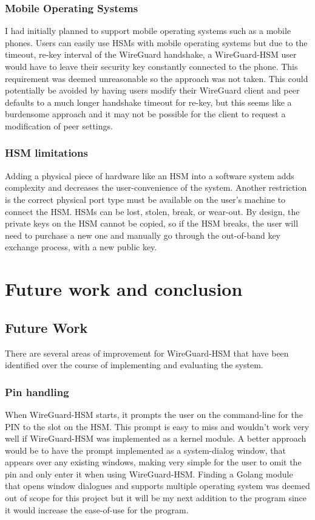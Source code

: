 \documentclass [11pt, proquest] {uwthesis}[2020/02/24]
\begin{document}
\subsection{Mobile Operating Systems}
I had initially planned to support mobile operating systems such as a mobile phones. Users can easily use HSMs with mobile operating systems but due to the timeout, re-key interval of the WireGuard handshake, a WireGuard-HSM user would have to leave their security key constantly connected to the phone. This requirement was deemed unreasonable so the approach was not taken. This could potentially be avoided by having users modify their WireGuard client and peer defaults to a much longer handshake timeout for re-key, but this seems like a burdensome approach and it may not be possible for the client to request a modification of peer settings.

\subsection{HSM limitations}
Adding a physical piece of hardware like an HSM into a software system adds complexity and decreases the user-convenience of the system. Another restriction is the correct physical port type must be available on the user's machine to connect the HSM. HSMs can be lost, stolen, break, or wear-out. By design, the private keys on the HSM cannot be copied, so if the HSM breaks, the user will need to purchase a new one and manually go through the out-of-band key exchange process, with a new public key.

\chapter {Future work and conclusion}

\section {Future Work}
There are several areas of improvement for WireGuard-HSM that have been identified over the course of implementing and evaluating the system. 

\subsection{Pin handling}
When WireGuard-HSM starts, it prompts the user on the command-line for the PIN to the slot on the HSM. 
This prompt is easy to miss and wouldn't work very well if WireGuard-HSM was implemented as a kernel module. A better approach would be to have the prompt implemented as a system-dialog window, that appears over any existing windows, making very simple for the user to omit the pin and only enter it when using WireGuard-HSM. Finding a Golang module that opens window dialogues and supports multiple operating system was deemed out of scope for this project but it will be my next addition to the program since it would increase the ease-of-use for the program. 
 
\end{document}
